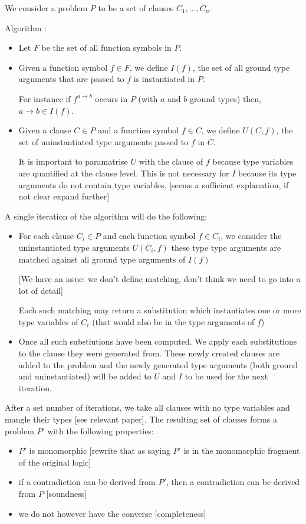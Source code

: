 \documentclass{article}
\begin{document}
We consider a problem \(P\) to be a set of clauses \(C_1, \dots, C_n\).

Algorithm :
\begin{itemize}
    \item Let \(F\) be the set of all function symbols in \(P\).
    \item Given a function symbol \(f \in F\), we define \(I(f)\), the set of all ground type arguments that are passed to \(f\) is instantiated in \(P\).

    For instance if \(f^{a \rightarrow b}\) occurs in \(P\) (with \(a\) and \(b\) ground types) then, \(a \rightarrow b \in I(f) \).
 \item Given a clause \(C \in P\) and a function symbol \(f \in C\), we define \(U(C, f)\), the set of uninstantiated type arguments passed to \(f\) in \(C\). 

    It is important to paramatrise \(U\) with the clause of \(f\) because type variables are quantified at the clause level. This is not necessary for \(I\) because its type arguments do not contain type variables. [seems a sufficient explanation, if not clear expand further]

\end{itemize}

A single iteration of the algorithm will do the following:
\begin{itemize}
   \item For each clause \(C_i \in P\) and each function symbol \(f \in C_i\), we consider the uninstantiated type arguments \(U(C_i, f)\) these type type arguments are matched against all ground type arguments of \(I(f)\)

      [We have an issue: we don't define matching, don't think we need to go into a lot of detail]

      Each such matching may return a substitution which instantiates one or more type variables of \(C_i\) (that would also be in the type arguments of \(f\))

   \item Once all such substiutions have been computed. We apply each substitutions to the clause they were generated from. These newly created clauses are added to the problem and the newly generated type arguments (both ground and uninstantiated) will be added to \(U\) and \(I\) to be used for the next iteration.
\end{itemize}

After a set number of iterations, we take all clauses with no type variables and mangle their types [see relevant paper]. The resulting set of clauses forms a problem \(P'\) with the following properties:
\begin{itemize}
   \item \(P'\) is monomorphic [rewrite that as saying \(P'\) is in the monomorphic fragment of the original logic]
   \item if a contradiction can be derived from \(P'\), then a contradiction can be derived from \(P\) [soundness]
   \item we do not however have the converse [completeness]
\end{itemize}
\end{document}
